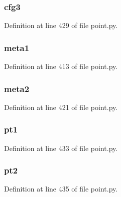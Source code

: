 \subsubsection[{cfg3}]{\setlength{\rightskip}{0pt plus 5cm}cfg3}\label{classpoint_1_1_point_test_a5b402ec456542d84ee7342bac3eca8da}


Definition at line 429 of file point.\+py.

\subsubsection[{meta1}]{\setlength{\rightskip}{0pt plus 5cm}meta1}\label{classpoint_1_1_point_test_adbfcd97f5920352e4777f5b329664174}


Definition at line 413 of file point.\+py.

\subsubsection[{meta2}]{\setlength{\rightskip}{0pt plus 5cm}meta2}\label{classpoint_1_1_point_test_ab630264d02ca9fc5b195598cd2f5c4ed}


Definition at line 421 of file point.\+py.

\subsubsection[{pt1}]{\setlength{\rightskip}{0pt plus 5cm}pt1}\label{classpoint_1_1_point_test_a5f1de4244cb639f915baa7cd0b9309c7}


Definition at line 433 of file point.\+py.

\subsubsection[{pt2}]{\setlength{\rightskip}{0pt plus 5cm}pt2}\label{classpoint_1_1_point_test_aaf832f30029a5d36fe3f55afcd7718b9}


Definition at line 435 of file point.\+py.

